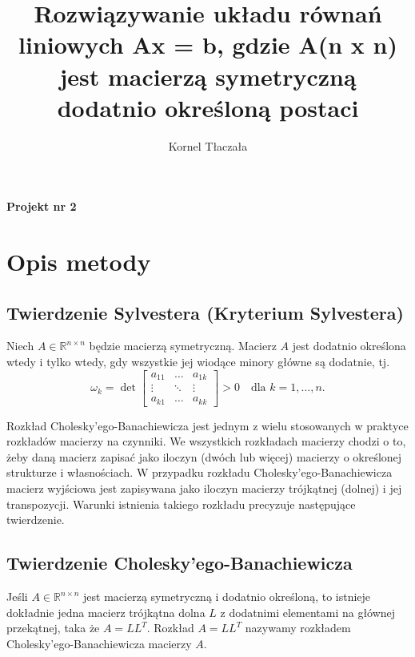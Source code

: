 \documentclass{article}
\title{Rozwiązywanie układu równań liniowych Ax = b, gdzie A(n x n) jest macierzą symetryczną dodatnio określoną postaci}
\author{Kornel Tłaczała}
\begin{document}
\maketitle

\vspace{0.2cm}
\begin{center}
\textbf{\large Projekt nr 2} \\
\end{center}

\section{Opis metody}
    \subsection*{Twierdzenie Sylvestera (Kryterium Sylvestera)}

Niech \( A \in \mathbb{R}^{n \times n} \) będzie macierzą symetryczną. Macierz \( A \) jest dodatnio określona wtedy i tylko wtedy, gdy wszystkie jej wiodące minory główne są dodatnie, tj.
\[ \omega_k = \det
\begin{bmatrix}
a_{11} & \dots & a_{1k} \\
\vdots & \ddots & \vdots \\
a_{k1} & \dots & a_{kk}
\end{bmatrix}
> 0 \quad \text{dla } k = 1, \ldots, n. \]

\vspace{10pt}
Rozkład Cholesky’ego-Banachiewicza jest jednym z wielu stosowanych w praktyce rozkładów macierzy na czynniki. We wszystkich rozkładach macierzy chodzi o to, żeby daną
macierz zapisać jako iloczyn (dwóch lub więcej) macierzy o określonej strukturze i własnościach. W przypadku rozkładu Cholesky’ego-Banachiewicza macierz wyjściowa jest
zapisywana jako iloczyn macierzy trójkątnej (dolnej) i jej transpozycji. Warunki istnienia
takiego rozkładu precyzuje następujące twierdzenie.


\subsection*{Twierdzenie Cholesky'ego-Banachiewicza}

Jeśli \( A \in \mathbb{R}^{n \times n} \) jest macierzą symetryczną i dodatnio określoną, to istnieje dokładnie jedna macierz trójkątna dolna \( L \) z dodatnimi elementami na głównej przekątnej, taka że \( A = LL^T \). Rozkład \( A = LL^T \) nazywamy rozkładem Cholesky'ego-Banachiewicza macierzy \( A \).
\end{document}
